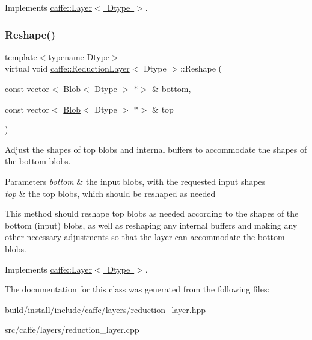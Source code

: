Implements \mbox{\hyperlink{classcaffe_1_1_layer_a7fe981e8af8d93d587acf2a952be563d}{caffe\+::\+Layer$<$ Dtype $>$}}.

\mbox{\label{classcaffe_1_1_reduction_layer_ad830b3c52fb34555e45cd172a8b27ed9}} 
\subsubsection{\texorpdfstring{Reshape()}{Reshape()}\hspace{0.1cm}{\footnotesize\ttfamily [2/2]}}
{\footnotesize\ttfamily template$<$typename Dtype$>$ \\
virtual void \mbox{\hyperlink{classcaffe_1_1_reduction_layer}{caffe\+::\+Reduction\+Layer}}$<$ Dtype $>$\+::Reshape (\begin{DoxyParamCaption}\item[{const vector$<$ \mbox{\hyperlink{classcaffe_1_1_blob}{Blob}}$<$ Dtype $>$ $\ast$$>$ \&}]{bottom,  }\item[{const vector$<$ \mbox{\hyperlink{classcaffe_1_1_blob}{Blob}}$<$ Dtype $>$ $\ast$$>$ \&}]{top }\end{DoxyParamCaption})\hspace{0.3cm}{\ttfamily [virtual]}}



Adjust the shapes of top blobs and internal buffers to accommodate the shapes of the bottom blobs. 


\begin{DoxyParams}{Parameters}
{\em bottom} & the input blobs, with the requested input shapes \\
\hline
{\em top} & the top blobs, which should be reshaped as needed\\
\hline
\end{DoxyParams}
This method should reshape top blobs as needed according to the shapes of the bottom (input) blobs, as well as reshaping any internal buffers and making any other necessary adjustments so that the layer can accommodate the bottom blobs. 

Implements \mbox{\hyperlink{classcaffe_1_1_layer_a7fe981e8af8d93d587acf2a952be563d}{caffe\+::\+Layer$<$ Dtype $>$}}.



The documentation for this class was generated from the following files\+:\begin{DoxyCompactItemize}
\item 
build/install/include/caffe/layers/reduction\+\_\+layer.\+hpp\item 
src/caffe/layers/reduction\+\_\+layer.\+cpp\end{DoxyCompactItemize}
